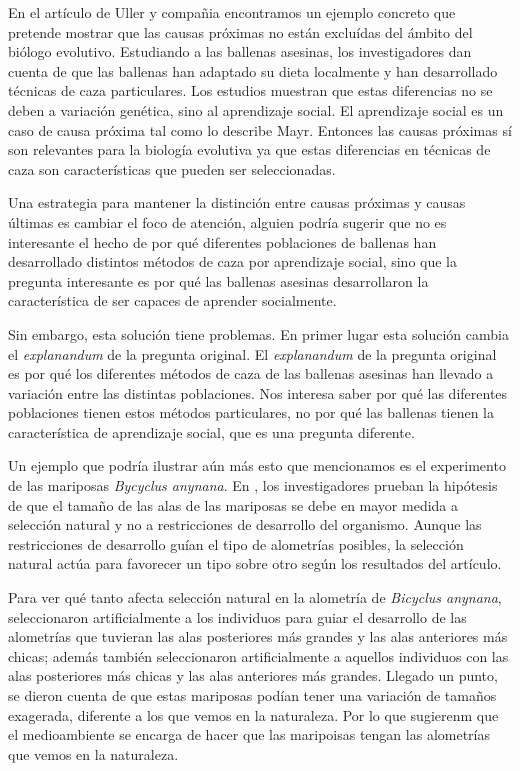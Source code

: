 En el artículo de Uller y compañia \citeyear{Uller2019} encontramos un ejemplo concreto que pretende mostrar que las causas próximas no están excluídas del ámbito del biólogo evolutivo. Estudiando a las ballenas asesinas, los investigadores dan cuenta de que las ballenas han adaptado su dieta localmente y han desarrollado técnicas de caza particulares. Los estudios muestran que estas diferencias no se deben a variación genética, sino al aprendizaje social. El aprendizaje social es un caso de causa próxima tal como lo describe Mayr. Entonces las causas próximas sí son relevantes para la biología evolutiva ya que estas diferencias en técnicas de caza son características que pueden ser seleccionadas.

Una estrategia para mantener la distinción entre causas próximas y causas últimas es cambiar el foco de atención, alguien podría sugerir que no es interesante el hecho de por qué diferentes poblaciones de ballenas han desarrollado distintos métodos de caza por aprendizaje social, sino que la pregunta interesante es por qué las ballenas asesinas desarrollaron la característica de ser capaces de aprender socialmente.

Sin embargo, esta solución tiene problemas. En primer lugar esta solución cambia el \emph{explanandum} de la pregunta original. El \emph{explanandum} de la pregunta original es por qué los diferentes métodos de caza de las ballenas asesinas han llevado a variación entre las distintas poblaciones. Nos interesa saber por qué las diferentes poblaciones tienen estos métodos particulares, no por qué las ballenas tienen la característica de aprendizaje social, que es una pregunta diferente.

Un ejemplo que podría ilustrar aún más esto que mencionamos es el experimento de las mariposas \textit{Bycyclus anynana}. En \cite{Frankino2007}, los investigadores prueban la hipótesis de que el tamaño de las alas de las mariposas se debe en mayor medida a selección natural y no a restricciones de desarrollo del organismo. Aunque las restricciones de desarrollo guían el tipo de alometrías posibles, la selección natural actúa para favorecer un tipo sobre otro según los resultados del artículo.

Para ver qué tanto afecta selección natural en la alometría de \emph{Bicyclus anynana}, seleccionaron artificialmente a los individuos para guiar el desarrollo de las alometrías que tuvieran las alas posteriores más grandes y las alas anteriores más chicas; además también seleccionaron artificialmente a aquellos individuos con las alas posteriores más chicas y las alas anteriores más grandes. Llegado un punto, se dieron cuenta de que estas mariposas podían tener una variación de tamaños exagerada, diferente a los que vemos en la naturaleza. Por lo que sugierenm que el medioambiente se encarga de hacer que las maripoisas tengan las alometrías que vemos en la naturaleza.

